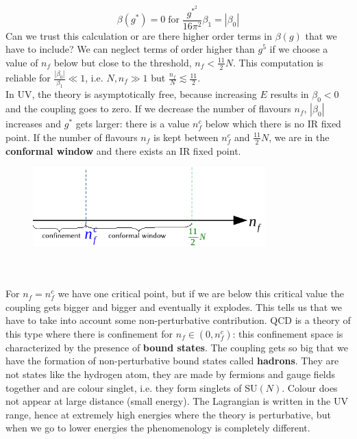\documentclass[../main.tex]{subfiles}
\begin{document}
\[
\beta(g^*)=0 \;\text{for}\;\frac{g^*^2}{16\pi^2}\beta_1=|\beta_0|
\]
Can we trust this calculation or are there higher order terms in $\beta(g)$ that we have to include? We can neglect terms of order higher than $g^5$ if we choose a value of $n_f$ below but close to the threshold, $n_f<\frac{11}{2}N$. This computation is reliable for $\frac{|\beta_0|}{\beta_1}\ll1$, i.e. $N,n_f\gg1$ but $\frac{n_f}{N}\lesssim\frac{11}{2}$.\\
In UV, the theory is asymptotically free, because increasing $E$ results in $\beta_0<0$ and the coupling goes to zero. If we decrease the number of flavours $n_f$, $|\beta_0|$ increases and $g^*$ gets larger: there is a value $n_f^c$ below which there is no IR fixed point. If the number of flavours $n_f$ is kept between $n_f^c$ and $\frac{11}{2} N$, we are in the \textbf{conformal window} and there exists an IR fixed point.
\begin{figure}[h]
    \centering
    \includegraphics[width=0.8\textwidth]{Images/conf.pdf}
    \caption{}
\end{figure}\\\\
For $n_f=n_f^c$ we have one critical point, but if we are below this critical value the coupling gets bigger and bigger and eventually it explodes. This tells us that we have to take into account some non-perturbative contribution. QCD is a theory of this type where there is confinement for $n_f\in(0,n_f^c)$: this confinement space is characterized by the presence of \textbf{bound states}. The coupling gets so big that we have the formation of non-perturbative bound states called \textbf{hadrons}. They are not states like the hydrogen atom, they are made by fermions and gauge fields together and are colour singlet, i.e. they form singlets of SU$(N)$. Colour does not appear at large distance (small energy). The Lagrangian is written in the UV range, hence at extremely high energies where the theory is perturbative, but when we go to lower energies the phenomenology is completely different.\\
\end{document}
